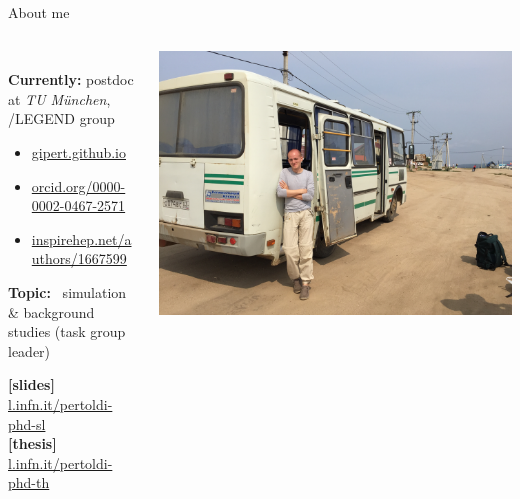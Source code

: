 \documentclass[10pt,aspectratio=169]{beamer}
\institute{Universit\`a degli Studi di Padova / INFN Padova}
\title{\mytitle}
\date{\place\ \sep\ \mydate}
\author{\people}
\begin{document}
\maketitle
\begin{frame}{About me}
  \begin{columns}
    \begin{column}{0.45\textwidth}\setlength{\parskip}{5pt}%
      \vspace*{1cm} \\
      \textbf{Currently:} postdoc at \emph{TU M\"unchen}, \gerda/LEGEND group
      \begin{itemize}
        \item \href{https://gipert.github.io}{gipert.github.io}
        \item \href{https://orcid.org/0000-0002-0467-2571}{orcid.org/0000-0002-0467-2571}
        \item \href{https://inspirehep.net/authors/1667599}{inspirehep.net/authors/1667599}
      \end{itemize}

      \textbf{Topic:} \gerda\ simulation \& background studies (task group leader)

      \vspace*{0.5cm}
      \footnotesize
      \textbf{[slides]} \href{https://l.infn.it/pertoldi-phd-sl}{l.infn.it/pertoldi-phd-sl} \\
      \textbf{[thesis]} \href{https://l.infn.it/pertoldi-phd-th}{l.infn.it/pertoldi-phd-th}
    \end{column}
    \begin{column}{0.55\textwidth}
      \vspace*{5mm}
      \includegraphics[trim=0 0 0 0,clip,width=\columnwidth]{me-siberia.jpg}
    \end{column}
  \end{columns}
\end{frame}
\end{document}

